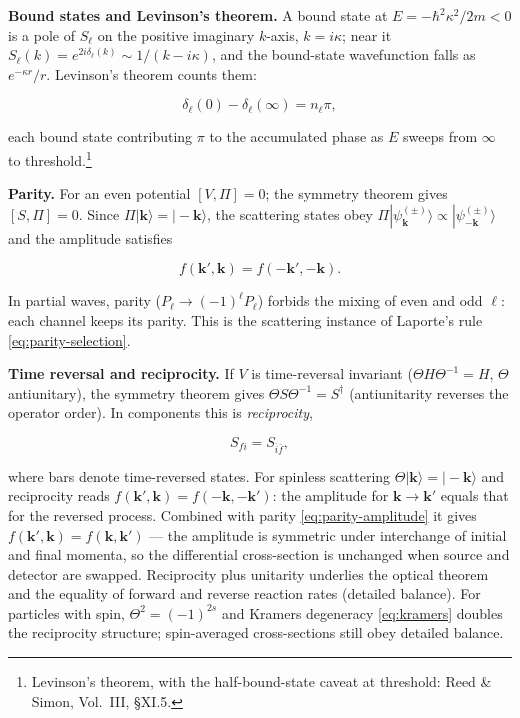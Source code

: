 \medskip\noindent\textbf{Bound states and Levinson's theorem.}
A bound state at $E=-\hbar^{2}\kappa^{2}/2m<0$ is a pole of $S_{\ell}$ on the positive imaginary $k$-axis, $k=i\kappa$; near it $S_{\ell}(k)=e^{2i\delta_{\ell}(k)}\sim 1/(k-i\kappa)$, and the bound-state wavefunction falls as $e^{-\kappa r}/r$. Levinson's theorem counts them:
\begin{linenomath}
\begin{equation*}
\delta_{\ell}(0)-\delta_{\ell}(\infty)=n_{\ell}\pi,
\end{equation*}
\end{linenomath}
each bound state contributing $\pi$ to the accumulated phase as $E$ sweeps from $\infty$ to threshold.\footnote{Levinson's theorem, with the half-bound-state caveat at threshold: Reed \& Simon, Vol.~III, \S XI.5.}

\medskip\noindent\textbf{Parity.} For an even potential $[V,\Pi]=0$; the symmetry theorem gives $[S,\Pi]=0$. Since $\Pi|\bm k\rangle=|-\bm k\rangle$, the scattering states obey $\Pi|\psi_{\bm k}^{(\pm)}\rangle\propto|\psi_{-\bm k}^{(\pm)}\rangle$ and the amplitude satisfies
\begin{linenomath}
\begin{equation}
f(\bm k',\bm k)=f(-\bm k',-\bm k).
\label{eq:parity-amplitude}
\end{equation}
\end{linenomath}
In partial waves, parity ($P_{\ell}\to(-1)^{\ell}P_{\ell}$) forbids the mixing of even and odd $\ell$: each channel keeps its parity. This is the scattering instance of Laporte's rule \eqref{eq:parity-selection}.

\medskip\noindent\textbf{Time reversal and reciprocity.} If $V$ is time-reversal invariant ($\Theta H\Theta^{-1}=H$, $\Theta$ antiunitary), the symmetry theorem gives $\Theta S\Theta^{-1}=S^{\dagger}$ (antiunitarity reverses the operator order). In components this is \emph{reciprocity},
\begin{linenomath}
\begin{equation}
S_{fi}=S_{\bar i\bar f},
\label{eq:reciprocity}
\end{equation}
\end{linenomath}
where bars denote time-reversed states. For spinless scattering $\Theta|\bm k\rangle=|-\bm k\rangle$ and reciprocity reads $f(\bm k',\bm k)=f(-\bm k,-\bm k')$: the amplitude for $\bm k\to\bm k'$ equals that for the reversed process. Combined with parity \eqref{eq:parity-amplitude} it gives $f(\bm k',\bm k)=f(\bm k,\bm k')$ --- the amplitude is symmetric under interchange of initial and final momenta, so the differential cross-section is unchanged when source and detector are swapped. Reciprocity plus unitarity underlies the optical theorem and the equality of forward and reverse reaction rates (detailed balance). For particles with spin, $\Theta^{2}=(-1)^{2s}$ and Kramers degeneracy \eqref{eq:kramers} doubles the reciprocity structure; spin-averaged cross-sections still obey detailed balance.


